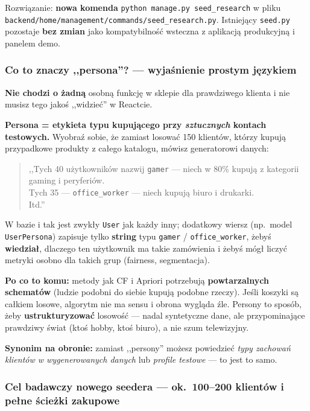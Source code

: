 \documentclass[a4paper,11pt]{article}
\newcommand{\code}[1]{\texttt{\small #1}}
\begin{document}
Rozwiązanie: \textbf{nowa komenda} \code{python manage.py seed\_research} w pliku \code{backend/home/management/commands/seed\_research.py}. Istniejący \code{seed.py} pozostaje \textbf{bez zmian} jako kompatybilność wsteczna z aplikacją produkcyjną i panelem demo.

\subsubsection{Co to znaczy ,,persona''? --- wyjaśnienie prostym językiem}\label{sec:co-to-persona}

\textbf{Nie chodzi o żadną} osobną funkcję w sklepie dla prawdziwego klienta i nie musisz tego jakoś ,,widzieć'' w Reactcie.

\medskip
\noindent\textbf{Persona = etykieta typu kupującego przy \emph{sztucznych} kontach testowych.} Wyobraź sobie, że zamiast losować 150 klientów, którzy kupują przypadkowe produkty z całego katalogu, mówisz generatorowi danych:

\begin{quote}
\small
,,Tych 40 użytkowników nazwij \texttt{gamer} --- niech w 80\% kupują z kategorii gaming i peryferiów.\\
Tych 35 --- \texttt{office\_worker} --- niech kupują biuro i drukarki.\\
Itd.''
\end{quote}

\noindent W bazie i tak jest zwykły \code{User} jak każdy inny; dodatkowy wiersz (np.\ model \code{UserPersona}) zapisuje tylko \textbf{string} typu \texttt{gamer} / \texttt{office\_worker}, żebyś \textbf{wiedział}, dlaczego ten użytkownik ma takie zamówienia i żebyś mógł liczyć metryki osobno dla takich grup (fairness, segmentacja).

\medskip
\noindent\textbf{Po co to komu:} metody jak CF i Apriori potrzebują \textbf{powtarzalnych schematów} (ludzie podobni do siebie kupują podobne rzeczy). Jeśli koszyki są całkiem losowe, algorytm nie ma sensu i obrona wygląda źle. Persony to sposób, żeby \textbf{ustrukturyzować} losowość --- nadal syntetyczne dane, ale przypominające prawdziwy świat (ktoś hobby, ktoś biuro), a nie szum telewizyjny.

\medskip
\noindent\textbf{Synonim na obronie:} zamiast ,,persony'' możesz powiedzieć \textit{typy zachowań klientów w wygenerowanych danych} lub \textit{profile testowe} --- to jest to samo.

\subsubsection{Cel badawczy nowego seedera --- ok.\ 100--200 klientów i pełne ścieżki zakupowe}
\end{document}
